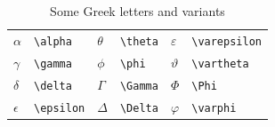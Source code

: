 \begin{frame}

\begin{table}

	\centering
	\caption{Some arrows, brackets, fonts}
\end{table}

%
%
%

\begin{table}

\centering
\begin{tabular}{ll|ll|ll}
	$\alpha$ &	\texttt{\textbackslash alpha}	&$\theta$	&	\texttt{\textbackslash theta}	&$\varepsilon$	&	\texttt{\textbackslash varepsilon}	\\
	$\gamma$&	\texttt{\textbackslash gamma}	&$\phi$	&	\texttt{\textbackslash phi}	&$\vartheta$	&	\texttt{\textbackslash vartheta}	\\
	$\delta$&	\texttt{\textbackslash delta}	&$\Gamma$	&	\texttt{\textbackslash Gamma}	&$\Phi$	&	\texttt{\textbackslash Phi}	\\
	$\epsilon$&	\texttt{\textbackslash epsilon}	&$\Delta$	&	\texttt{\textbackslash Delta}	&$\varphi$	&	\texttt{\textbackslash varphi}	\\
\end{tabular}
\caption{Some Greek letters and variants}
\end{table}


\end{frame}



